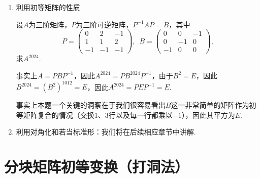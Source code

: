 \begin{enumerate}
          \begin{proof}
              \begin{enumerate}
                  \item 若$l\leqslant 2$，则$A^2=O$显然成立；

                  \item 若$l>2$，则由$A^l=O$可知$A$不可逆，故$r(A)\leqslant 1$，又$A\neq O$，因此$r(A)=1$，故$A^l=(\tr(A))^{l-1}A=O$，因此$\tr(A)=0$，故$A^2=\tr(A)A=O$.
              \end{enumerate}
          \end{proof}

    \item 利用初等矩阵的性质
          \begin{example}{}{}
              设$A$为三阶矩阵，$P$为三阶可逆矩阵，$P^{-1}AP=B$，其中
              \[P=\begin{pmatrix}
                      0 & 2 & -1 \\ 1 & 1 & 2 \\ -1 & -1 & -1
                  \end{pmatrix},\enspace B=\begin{pmatrix}
                      0 & 0 & -1 \\ 0 & -1 & 0 \\ -1 & 0 & 0
                  \end{pmatrix},\]
              求$A^{2024}$.
          \end{example}
          \begin{solution}
              事实上$A=PBP^{-1}$，因此$A^{2024}=PB^{2024}P^{-1}$，由于$B^2=E$，因此$B^{2024}=(B^2)^{1012}=E$，因此$A^{2024}=PEP^{-1}=E$.
          \end{solution}

          事实上本题一个关键的洞察在于我们很容易看出$B$这一非常简单的矩阵作为初等矩阵复合的情况（交换1、3行以及每一行都乘以$-1$），因此其平方为$E$.

    \item 利用对角化和若当标准形：我们将在后续相应章节中讲解.
\end{enumerate}

\section{分块矩阵初等变换（打洞法）}

